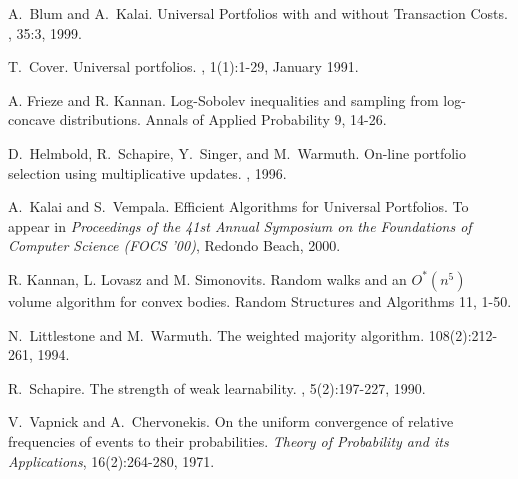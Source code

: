 \begin{thebibliography}{99}

\newblock A.~Blum and A.~Kalai.
\newblock Universal Portfolios with and without Transaction Costs.
, 35:3, 1999.

\newblock T.~Cover.
\newblock Universal portfolios.
, 1(1):1-29, January 1991.

\newblock A. Frieze and R. Kannan.
\newblock Log-Sobolev inequalities and sampling from log-concave distributions.
\newblock Annals of Applied Probability 9, 14-26.

\newblock D.~Helmbold, R.~Schapire, Y.~Singer, and M.~Warmuth.
\newblock On-line portfolio selection using multiplicative updates. 
, 1996.

\newblock A.~Kalai and S.~Vempala.
\newblock Efficient Algorithms for Universal Portfolios.
\newblock To appear in {\em Proceedings of the 41st Annual Symposium on the
Foundations of Computer Science (FOCS '00)}, Redondo Beach, 2000. 

\newblock R. Kannan, L. Lovasz and M. Simonovits.
\newblock Random walks and an $O^*(n^5)$ volume algorithm for convex bodies.
\newblock Random Structures and Algorithms 11, 1-50.

\newblock N.~Littlestone and M.~Warmuth.  
\newblock The weighted majority algorithm.
 108(2):212-261, 1994.

\newblock R.~Schapire.  
\newblock The strength of weak learnability.  
,
5(2):197-227, 1990. 

\newblock V.~Vapnick and A.~Chervonekis.  On the uniform convergence of
relative frequencies of events to their probabilities.  {\em Theory of
Probability and its Applications}, 16(2):264-280, 1971.


\end{thebibliography}




